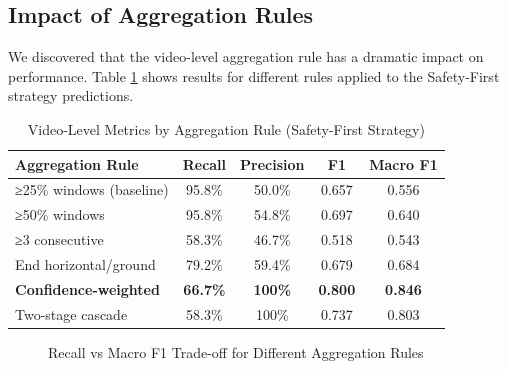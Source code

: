 \documentclass[conference]{IEEEtran}
\begin{document}
\subsection{Impact of Aggregation Rules}

We discovered that the video-level aggregation rule has a dramatic impact on performance. Table \ref{tab:aggregation} shows results for different rules applied to the Safety-First strategy predictions.

\begin{table}[h]
\centering
\caption{Video-Level Metrics by Aggregation Rule (Safety-First Strategy)}
\label{tab:aggregation}
\begin{tabular}{lcccc}
\toprule
\textbf{Aggregation Rule} & \textbf{Recall} & \textbf{Precision} & \textbf{F1} & \textbf{Macro F1} \\
\midrule
≥25\% windows (baseline) & 95.8\% & 50.0\% & 0.657 & 0.556 \\
≥50\% windows & 95.8\% & 54.8\% & 0.697 & 0.640 \\
≥3 consecutive & 58.3\% & 46.7\% & 0.518 & 0.543 \\
End horizontal/ground & 79.2\% & 59.4\% & 0.679 & 0.684 \\
\textbf{Confidence-weighted} & \textbf{66.7\%} & \textbf{100\%} & \textbf{0.800} & \textbf{0.846} \\
Two-stage cascade & 58.3\% & 100\% & 0.737 & 0.803 \\
\bottomrule
\end{tabular}
\end{table}

\begin{figure}[h]
\centering
{}
\caption{Recall vs Macro F1 Trade-off for Different Aggregation Rules}
\label{fig:tradeoff}
\end{figure}
\end{document}
